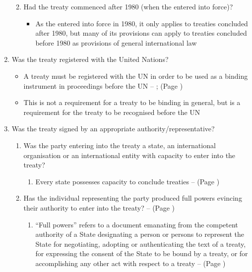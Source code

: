 \begin{enumerate}
\begin{enumerate}
\begin{enumerate}
        \end{enumerate}
        \item Had the treaty commenced after 1980 (when the  entered into force)?
        \begin{itemize}
            \item As the  entered into force in 1980, it only applies to treaties concluded after 1980, but many of its provisions can apply to treaties concluded before 1980 as provisions of general international law
        \end{itemize}
    \end{enumerate}
    \item Was the treaty registered with the United Nations?
    \begin{itemize}
        \item A treaty must be registered with the UN in order to be used as a binding instrument in proceedings before the UN -- ;  (Page \pageref{convention:UN Charter Art 102})
        \item This is not a requirement for a treaty to be binding in general, but is a requirement for the treaty to be recognised before the UN
    \end{itemize}
    \item Was the treaty signed by an appropriate authority/representative?
    \begin{enumerate}
        \item Was the party entering into the treaty a state, an international organisation or an international entity with capacity to enter into the treaty?
        \begin{enumerate}
            \item Every state possesses capacity to conclude treaties --  (Page \pageref{VCLT Art 6})
        \end{enumerate}
        \item Has the individual representing the party produced full powers evincing their authority to enter into the treaty? --  (Page \pageref{VCLT Art 2})
        \begin{enumerate}
            \item ``Full powers'' refers to a document emanating from the competent authority of a State designating a person or persons to represent the State for negotiating, adopting or authenticating the text of a treaty, for expressing the consent of the State to be bound by a treaty, or for accomplishing any other act with respect to a treaty --  (Page \pageref{VCLT Art 2})

\end{enumerate}
\end{enumerate}
\end{enumerate}
